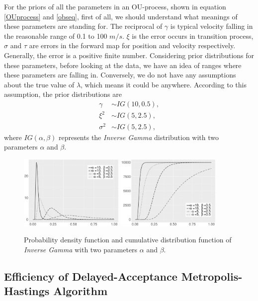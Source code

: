 For the priors of all the parameters in an OU-process, shown in equation \eqref{OUprocess} and \eqref{obseq}, first of all, we should understand what meanings of these parameters are standing for. The reciprocal of $\gamma$ is typical velocity falling in the reasonable range of 0.1 to 100 $m/s$. $\xi$ is the error occurs in transition process, $\sigma$ and $\tau$ are errors in the forward map for position and velocity respectively. Generally, the error is a positive finite number. Considering prior distributions for these parameters, before looking at the data, we have an idea of ranges where these parameters are falling in. Conversely, we do not have any assumptions about the true value of $\lambda$, which means it could be anywhere. According to this assumption, the prior distributions are 
\begin{align*}
\gamma   &\sim IG(10,0.5),\\
\xi^2        &\sim IG(5,2.5),\\
\sigma^2 &\sim IG(5,2.5),
\end{align*}
where $IG(\alpha,\beta)$ represents the \textit{Inverse Gamma} distribution with two parameters $\alpha$ and $\beta$. 
\begin{figure}[h]
\centering
\includegraphics[width=0.45\textwidth]{Chapters/05MCMCOU/plots/ggIGPDF_Final.pdf}
\includegraphics[width=0.45\textwidth]{Chapters/05MCMCOU/plots/ggIGCDF_Final.pdf}
\caption{Probability density function and cumulative distribution function of \textit{Inverse Gamma} with two parameters $\alpha$ and $\beta$. }
\label{IGPDFCDF}
\end{figure}


\subsection{Efficiency of Delayed-Acceptance Metropolis-Hastings Algorithm}

